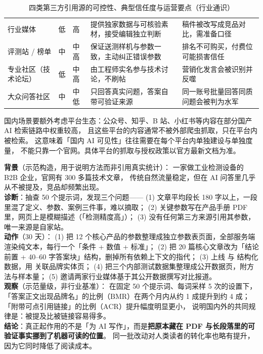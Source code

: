 \begin{table}[htbp]
\centering
\caption{四类第三方引用源的可控性、典型信任度与运营要点（行业通识）}
\label{tab:third-party-sources}
\small
\begin{tabularx}{\textwidth}{L{2.3cm} L{2.0cm} L{2.2cm} L{3.0cm} Y}
\toprule
{} &  &  &  &  \\
\midrule
行业媒体 & 低 & 高 & 提供独家数据与可核验素材，接受编辑独立判断 & 稿件被改写成竞品对比，需准备口径 \\
评测站 / 榜单 & 中 & 中高 & 保证送测样机与参数一致，主动纠正错误参数 & 排名不可购买，付费位可能损害信任 \\
专业社区（技术论坛） & 低 & 中高 & 由工程师实名参与技术讨论，不刷帖 & 营销化发言会被识别并反噬 \\
大众问答社区 & 中 & 中低 & 只回答真实问题，答案自带可验证来源 &
  同一账号批量回答同质问题会被判为水军 \\
\bottomrule
\end{tabularx}
\end{table}

国内场景要额外考虑平台生态：公众号、知乎、B 站、小红书等内容在部分国产 AI 检索链路中权重较高，
且这些平台的内容通常不被外部爬虫抓取，只在平台内被检索。
这意味着「国内 AI 可见性」往往需要在每个平台内单独建设与单独度量，
不能只靠一个官网。具体平台的抓取与授权政策以官方最新文档为准。

\begin{casebox}
\textbf{背景}（示范构造，用于说明方法而非引用真实统计）：
一家做工业检测设备的 B2B 企业，官网有 300 多篇技术文章，
传统自然流量稳定，但在 AI 问答里几乎从不被提及，竞品却频繁出现。\\
\textbf{诊断}：抽查 50 个提示词，发现三个问题——
(1) 文章平均段长 180 字以上，一段里混了定义、参数、案例三件事，难以摘取；
(2) 关键参数写在产品手册 PDF 里，网页上是模糊描述（「检测精度高」）；
(3) 没有任何第三方来源引用其参数，唯一来源是自家站。\\
\textbf{动作}（30 天）：
(1) 把 12 个核心产品的参数整理成独立参数表页面，全部服务端渲染纯文本，每行一个「条件 + 数值 + 标准」；
(2) 把 20 篇核心文章改为「结论前置 + 40--60 字答案块」结构，删掉所有依赖上下文的指代；
(3) 上线  与  结构化数据，用  关联品牌实体页；
(4) 把三个内部测试数据集整理成公开数据页，附方法与样本量；
(5) 邀请两家行业媒体基于其公开数据撰写对比报道。\\
\textbf{观察}（示范量级，非行业基准）：
在固定 50 个提示词、每词采样 5 次的设置下，
「答案正文出现品牌名」的比例（$\mathrm{BMR}$）在两个月内从约 1 成提升到约 4 成；
「附带可点引用链接」的比例（$\mathrm{ACR}$）提升幅度明显更小，
说明国内外的共同规律是：被提及比被链接容易得多。\\
\textbf{结论}：真正起作用的不是「为 AI 写作」，而是\textbf{把原本藏在 PDF 与长段落里的可验证事实挪到了机器可读的位置}。
同一批改动对人类读者的转化率也略有提升，因为它同时降低了阅读成本。
\end{casebox}

